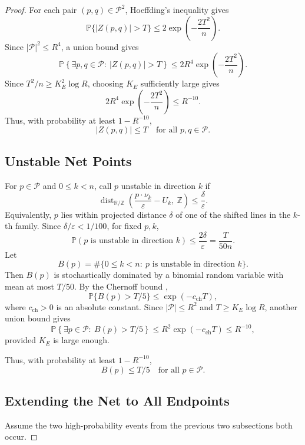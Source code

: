 \documentclass[11pt]{article}
\newcommand{\R}{\mathbb R}
\newcommand{\Z}{\mathbb Z}
\newcommand{\Prob}{\mathbb P}
\newcommand{\eps}{\varepsilon}
\newcommand{\dist}{\operatorname{dist}}
\begin{document}
\begin{proof}
\bigskip
\noindent
For each pair $(p,q)\in\mathcal P^2$, Hoeffding's inequality gives
\[
        \Prob\{|Z(p,q)|>T\}
        \le
        2\exp\left(-\frac{2T^2}{n}\right).
\]
Since $|\mathcal P|^2\le R^4$, a union bound gives
\[
        \Prob\left\{
        \exists p,q\in\mathcal P:\ |Z(p,q)|>T
        \right\}
        \le
        2R^4\exp\left(-\frac{2T^2}{n}\right).
\]
Since $T^2/n\ge K_E^2\log R$, choosing $K_E$ sufficiently large gives
\[
        2R^4\exp\left(-\frac{2T^2}{n}\right)
        \le
        R^{-10}.
\]
Thus, with probability at least $1-R^{-10}$,
\[
        |Z(p,q)|\le T
        \quad
        \text{for all }p,q\in\mathcal P.
\]

\subsection{Unstable Net Points}

For $p\in\mathcal P$ and $0\le k<n$, call $p$ unstable in direction $k$ if
\[
        \dist_{\R/\Z}\left(
        \frac{p\cdot\nu_k}{\eps}-U_k,\ 
        \Z
        \right)
        \le
        \frac{\delta}{\eps}.
\]
Equivalently, $p$ lies within projected distance $\delta$ of one of the shifted lines in the $k$-th family. Since $\delta/\eps<1/100$, for fixed $p,k$,
\[
        \Prob(p\text{ is unstable in direction }k)
        \le
        \frac{2\delta}{\eps}
        =
        \frac{T}{50n}.
\]
Let
\[
        B(p)=
        \#\{0\le k<n:\ p\text{ is unstable in direction }k\}.
\]
Then $B(p)$ is stochastically dominated by a binomial random variable with mean at most $T/50$. By the Chernoff bound \cite{Chernoff1952},
\[
        \Prob\{B(p)>T/5\}
        \le
        \exp(-c_{\mathrm{ch}}T),
\]
where $c_{\mathrm{ch}}>0$ is an absolute constant. Since $|\mathcal P|\le R^2$ and $T\ge K_E\log R$, another union bound gives
\[
        \Prob\left\{
        \exists p\in\mathcal P:\ B(p)>T/5
        \right\}
        \le
        R^2\exp(-c_{\mathrm{ch}}T)
        \le
        R^{-10},
\]
provided $K_E$ is large enough.

\bigskip
\noindent
Thus, with probability at least $1-R^{-10}$,
\[
        B(p)\le T/5
        \quad
        \text{for all }p\in\mathcal P.
\]

\subsection{Extending the Net to All Endpoints}

Assume the two high-probability events from the previous two subsections both occur.


\end{proof}
\end{document}
